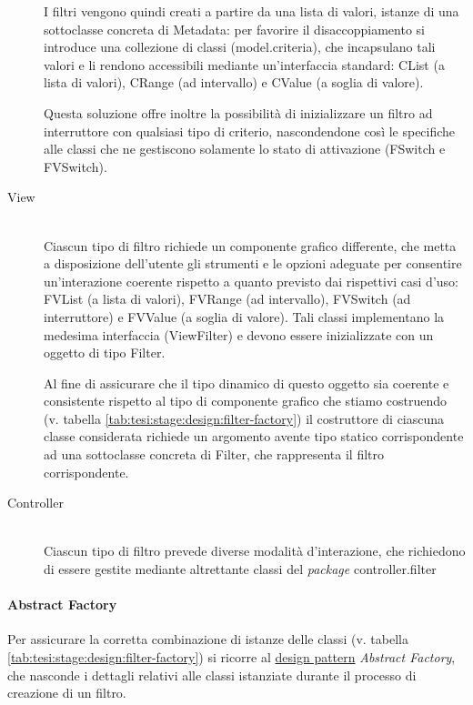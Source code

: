 \begin{description}
	I filtri vengono quindi creati a partire da una lista di valori, istanze di una sottoclasse concreta di \textsf{Metadata}: per favorire il disaccoppiamento si introduce una collezione di classi (\textsf{model.criteria}), che incapsulano tali valori e li rendono accessibili mediante un'interfaccia standard: \textsf{CList} (a lista di valori), \textsf{CRange} (ad intervallo) e \textsf{CValue} (a soglia di valore).

	Questa soluzione offre inoltre la possibilità di inizializzare un filtro ad interruttore con qualsiasi tipo di criterio, nascondendone così le specifiche alle classi che ne gestiscono solamente lo stato di attivazione (\textsf{FSwitch} e \textsf{FVSwitch}).

	\item[View] \hfill \\
	Ciascun tipo di filtro richiede un componente grafico differente, che metta a disposizione dell'utente gli strumenti e le opzioni adeguate per consentire un'interazione coerente rispetto a quanto previsto dai rispettivi casi d'uso: \textsf{FVList} (a lista di valori), \textsf{FVRange} (ad intervallo), \textsf{FVSwitch} (ad interruttore) e \textsf{FVValue} (a soglia di valore). Tali classi implementano la medesima interfaccia (\textsf{ViewFilter}) e devono essere inizializzate con un oggetto di tipo \textsf{Filter}.

	Al fine di assicurare che il tipo dinamico di questo oggetto sia coerente e consistente rispetto al tipo di componente grafico che stiamo costruendo (v. tabella \ref{tab:tesi:stage:design:filter-factory}) il costruttore di ciascuna classe considerata richiede un argomento avente tipo statico corrispondente ad una sottoclasse concreta di \textsf{Filter}, che rappresenta il filtro corrispondente.

	\item[Controller] \hfill \\
	Ciascun tipo di filtro prevede diverse modalità d'interazione, che richiedono di essere gestite mediante altrettante classi del \textit{package} \textsf{controller.filter}
\end{description}

\paragraph{Abstract Factory}
Per assicurare la corretta combinazione di istanze delle classi (v. tabella \ref{tab:tesi:stage:design:filter-factory}) si ricorre al \underline{design pattern} \textit{Abstract Factory}, che nasconde i dettagli relativi alle classi istanziate durante il processo di creazione di un filtro.

